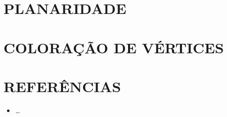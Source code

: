 \documentclass[
12pt,
a4paper,
semrecuonosumario,
sumario = abnt-6027-2012]{report}
\begin{document}
	\chapter{PLANARIDADE}\label{cap:planaridade}


	\chapter{COLORAÇÃO DE VÉRTICES}\label{cap:coloracaoVertices}


	\clearpage
	\chapter*{REFERÊNCIAS}
	\vspace{-0.5em}
	\begin{itemize}
		\item \dots
	\end{itemize}
\end{document}
